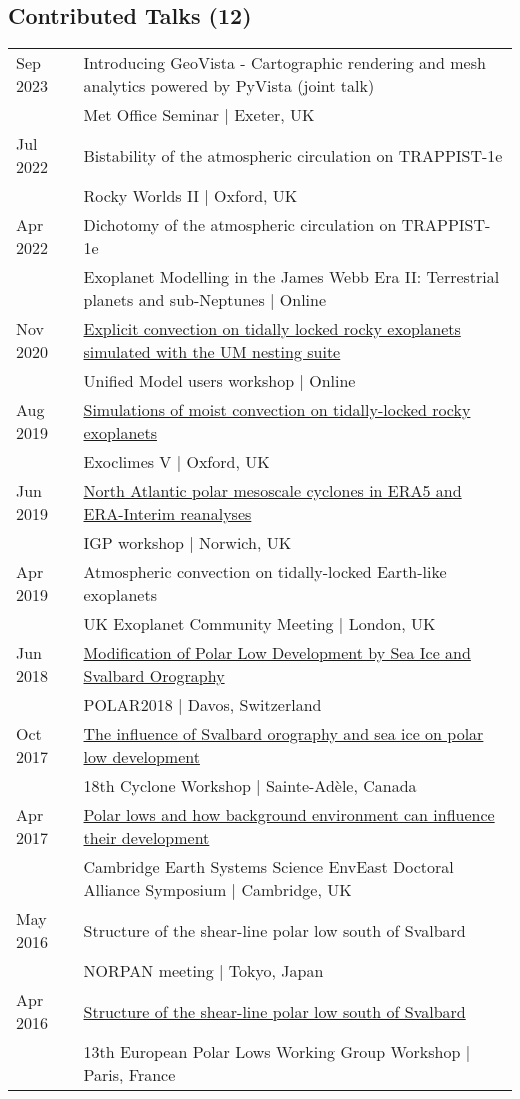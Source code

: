 \documentclass[a4paper, 11pt]{article}
\begin{document}
\subsection*{Contributed Talks (12)}
\begin{tabularx}{\linewidth}{@{}l X@{}}
Sep 2023 & Introducing GeoVista - Cartographic rendering and mesh analytics powered by PyVista (joint talk) \\ & Met Office Seminar | Exeter, UK \\
Jul 2022 & Bistability of the atmospheric circulation on TRAPPIST-1e \\ & Rocky Worlds II | Oxford, UK \\
Apr 2022 & Dichotomy of the atmospheric circulation on TRAPPIST-1e \\ & Exoplanet Modelling in the James Webb Era II: Terrestrial planets and sub-Neptunes | Online \\
Nov 2020 & \href{https://slides.com/denissergeev/2020-11-10-um-workshop-sergeev}{Explicit convection on tidally locked rocky exoplanets simulated with the UM nesting suite} \\ & Unified Model users workshop | Online \\
Aug 2019 & \href{https://youtu.be/9nGIpQiPwDs}{Simulations of moist convection on tidally-locked rocky exoplanets} \\ & Exoclimes V | Oxford, UK \\
Jun 2019 & \href{https://speakerdeck.com/dennissergeev/north-atlantic-polar-mesoscale-cyclones-in-era5-and-era-interim-reanalyses}{North Atlantic polar mesoscale cyclones in ERA5 and ERA-Interim reanalyses} \\ & IGP workshop | Norwich, UK \\
Apr 2019 & Atmospheric convection on tidally-locked Earth-like exoplanets \\ & UK Exoplanet Community Meeting | London, UK \\
Jun 2018 & \href{https://speakerdeck.com/dennissergeev/polar2018}{Modification of Polar Low Development by Sea Ice and Svalbard Orography} \\ & POLAR2018 | Davos, Switzerland \\
Oct 2017 & \href{https://figshare.com/articles/The_influence_of_Svalbard_orography_and_sea_ice_on_polar_low_development/5510416}{The influence of Svalbard orography and sea ice on polar low development} \\ & 18th Cyclone Workshop | Sainte-Adèle, Canada \\
Apr 2017 & \href{http://dennissergeev.github.io/ceeda2017}{Polar lows and how background environment can influence their development} \\ & Cambridge Earth Systems Science EnvEast Doctoral Alliance Symposium | Cambridge, UK \\
May 2016 & Structure of the shear-line polar low south of Svalbard \\ & NORPAN meeting | Tokyo, Japan \\
Apr 2016 & \href{http://slides.com/denissergeev/deck}{Structure of the shear-line polar low south of Svalbard} \\ & 13th European Polar Lows Working Group Workshop | Paris, France \\
\end{tabularx}
\end{document}
